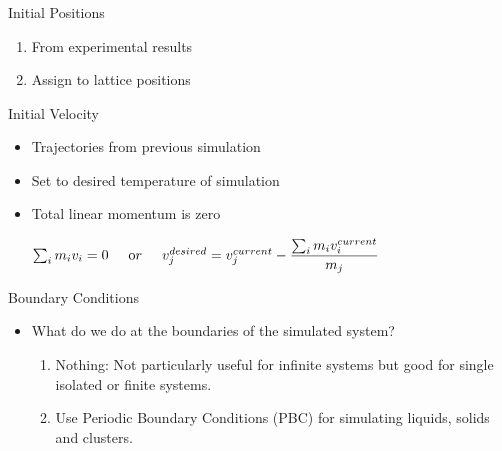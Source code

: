 \documentclass[slidestop,mathserif,compress,xcolor=svgnames]{beamer}
\newenvironment{bblock}[0]
{
\begin{beamerboxesrounded}[upper=uppercol1,lower=lowercol1,shadow=true]}
{\end{beamerboxesrounded}}
\begin{document}
\begin{frame}
  \frametitle{}
  \begin{bblock}{Initial Positions}
    \begin{enumerate}
    \item From experimental results
    \item Assign to lattice positions
    \end{enumerate}
  \end{bblock}
  \begin{bblock}{Initial Velocity}
    \begin{itemize}
    \item Trajectories from previous simulation
    \item Set to desired temperature of simulation
    \item Total linear momentum is zero
      \begin{center}
        $\sum_i m_iv_i = 0\hspace{0.5cm}{\mathrm or}\hspace{0.5cm}
        v^{desired}_j = v^{current}_j - \dfrac{\sum_i m_iv^{current}_i }{m_j}$
      \end{center}
    \end{itemize}
  \end{bblock}
\end{frame}

\begin{frame}
  \begin{bblock}{Boundary Conditions}
    \begin{itemize}
    \item What do we do at the boundaries of the simulated system?
      \begin{enumerate}
      \item Nothing: Not particularly useful for infinite systems but good for single isolated or finite systems.
      \item Use Periodic Boundary Conditions (PBC) for simulating liquids, solids and clusters.
      \end{enumerate}
    \end{itemize}
  \end{bblock}
\end{frame}
\end{document}
